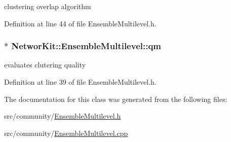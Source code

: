 clustering overlap algorithm 



Definition at line 44 of file Ensemble\-Multilevel.\-h.

\hypertarget{class_networ_kit_1_1_ensemble_multilevel_a915aae76cd6660ae3a541d36969ebeea}{
\subsubsection[{qm}]{$\ast$ Networ\-Kit\-::\-Ensemble\-Multilevel\-::qm\hspace{0.3cm}{\ttfamily [protected]}}}\label{class_networ_kit_1_1_ensemble_multilevel_a915aae76cd6660ae3a541d36969ebeea}


evaluates clutering quality 



Definition at line 39 of file Ensemble\-Multilevel.\-h.



The documentation for this class was generated from the following files\-:\begin{DoxyCompactItemize}
\item 
src/community/\hyperlink{_ensemble_multilevel_8h}{Ensemble\-Multilevel.\-h}\item 
src/community/\hyperlink{_ensemble_multilevel_8cpp}{Ensemble\-Multilevel.\-cpp}\end{DoxyCompactItemize}
